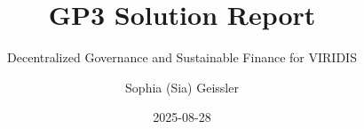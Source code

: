 \documentclass[
  english,
  12pt,
  oneside,
  open=any]{scrbook}
\title{GP3 Solution Report}
\subtitle{Decentralized Governance and Sustainable Finance for VIRIDIS}
\author{Sophia (Sia) Geissler}
\date{2025-08-28}
\begin{document}

  \begin{frontmatter}

\begin{titlepage}


\newcommand{\titlepagepagealign}{
\ifthenelse{\equal{left}{right}}{\raggedleft}{}
\ifthenelse{\equal{left}{center}}{\centering}{}
\ifthenelse{\equal{left}{left}}{\raggedright}{}
}


\newcommand{\titleandsubtitle}{
{{\large{\bfseries{\nohyphens{GP3 Solution Report}}}}\par
}%

\vspace{\betweentitlesubtitle}
{
{\large{\textit{\nohyphens{Decentralized Governance and Sustainable
Finance for VIRIDIS}}}}\par
}}
\newcommand{\titlepagetitleblock}{
\titleandsubtitle
}

\newcommand{\authorstyle}[1]{{\large{#1}}}

\newcommand{\affiliationstyle}[1]{{\large{#1}}}

\newcommand{\titlepageauthorblock}{
{\authorstyle{\nohyphens{Sophia (Sia) Geissler}{\textsuperscript{1}}}}}

\newcommand{\titlepageaffiliationblock}{
\hangindent=1em
\hangafter=1
{\affiliationstyle{
{1}.~Inholland University of Applied Sciences,~Haarlem, The Netherlands


\vspace{1\baselineskip} 
}}
}
\newcommand{\headerstyled}{%
{Graduation Project 3 --- Business Innovation}
}
\newcommand{\footerstyled}{%
{\large{Inholland University of Applied Sciences\\
GP3 Solution Report\\
VIRIDIS --- Green Tech Investment AG}}
}
\newcommand{\datestyled}{%
{2025-08-28}
}


\newcommand{\titlepageheaderblock}{\headerstyled}

\newcommand{\titlepagefooterblock}{
\footerstyled
}

\newcommand{\titlepagedateblock}{
\datestyled
}

\newcommand{\titleblock}{\newlength{\betweentitlesubtitle}
\setlength{\betweentitlesubtitle}{\baselineskip}
{

{\titlepagetitleblock}
}

}
\end{titlepage}
\end{frontmatter}
\end{document}

